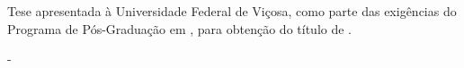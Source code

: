 
   \thispagestyle{empty}
   \setcounter{page}{0}
\begin{spacing}{1}
	\begin{center}
		\vspace*{-0.5cm}
		{\MakeUppercase{\nome} \\ }
		
		
		\vspace*{8cm}
		{\MakeUppercase{\textbf{\titulo}} \\ }
	\end{center}
	\vspace*{4cm}
	\singlespacing
	\begin{flushright}
		\begin{minipage}{7.5cm}
			{Tese apresentada à Universidade Federal de Viçosa, como parte
				das exigências do Programa de Pós-Graduação em \programa, para
				obtenção do título de \textit{\titulop}.}
		\end{minipage}
	\end{flushright}
	\vfill
	
	\begin{center}
	\MakeUppercase{\cidade}
	
	\MakeUppercase{\estado}
	
	\MakeUppercase{\mes} - \MakeUppercase{\ano}
	
	
	\end{center}
	
\end{spacing}

